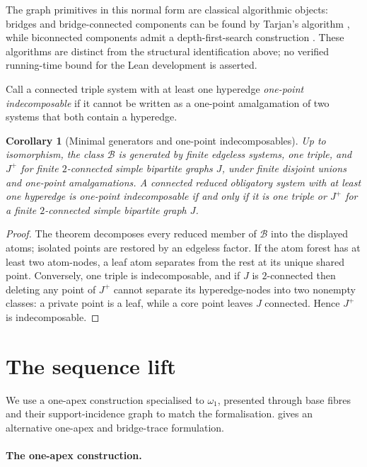 \documentclass[a4paper,11pt,reqno]{amsart}
\theoremstyle{plain}
\newtheorem{corollary}[theorem]{Corollary}
\theoremstyle{definition}
\theoremstyle{remark}
\begin{document}
The graph primitives in this normal form are classical algorithmic objects:
bridges and bridge-connected components can be found by Tarjan's algorithm
\citep{tarjan1974}, while biconnected components admit a depth-first-search
construction \citep{tarjan1972}.  These algorithms are distinct from the
structural identification above; no verified running-time bound for the Lean
development is asserted.

Call a connected triple system with at least one hyperedge \emph{one-point
indecomposable} if it cannot be written as a one-point amalgamation of two
systems that both contain a hyperedge.

\begin{corollary}[Minimal generators and one-point indecomposables]
\label{corollary-minimal-generators-indecomposables}
Up to isomorphism, the class $\mathcal B$ is generated by finite edgeless
systems, one triple, and $J^+$ for finite $2$-connected simple bipartite graphs
$J$, under finite disjoint unions and one-point amalgamations.  A connected
reduced obligatory system with at least one hyperedge is
one-point indecomposable if and only if it is one triple or $J^+$ for a finite
$2$-connected simple bipartite graph $J$.
\end{corollary}
\begin{proof}
The theorem decomposes every reduced member of $\mathcal B$ into the displayed
atoms; isolated points are restored by an edgeless factor.  If the atom forest
has at least two atom-nodes, a leaf atom separates from the rest at its unique
shared point.  Conversely, one triple is indecomposable, and if $J$ is
$2$-connected then deleting any point of $J^+$ cannot separate its
hyperedge-nodes into two nonempty classes: a private point is a leaf, while a
core point leaves $J$ connected.  Hence $J^+$ is indecomposable.
\end{proof}

\section{The sequence lift}\label{the-sequence-lift-used-in-the-avoidance-constructions}

We use a one-apex construction specialised to $\omega_1$, presented through
base fibres and their support-incidence graph to match the formalisation.
\citet[Sections~3--4 and Theorem~4.6]{li2026} gives an alternative one-apex
and bridge-trace formulation.

\paragraph{The one-apex construction.}\label{the-one-apex-construction}
\end{document}

